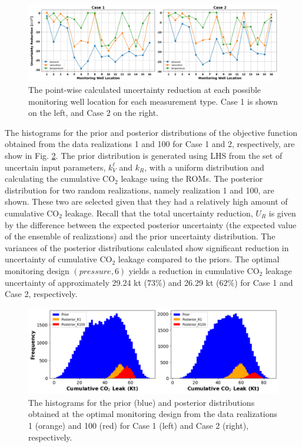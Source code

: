 \documentclass[a4paper,fleqn]{cas-sc}
\begin{document}
\begin{figure}
    \centering
    \includegraphics[width=16cm]{figs/Figure 11.pdf}
    \caption{The point-wise calculated uncertainty reduction at each possible monitoring well location for each measurement type. Case 1 is shown on the left, and Case 2 on the right.}
    \label{point_ur}
\end{figure}

The histograms for the prior and posterior distributions of the objective function obtained from the data realizations 1 and 100 for Case 1 and 2, respectively, are show in Fig. \ref{ur_dist}. The prior distribution is generated using LHS from the set of uncertain input parameters, $k_V^\ell$ and $k_R$, with a uniform distribution and calculating the cumulative CO$_2$ leakage using the ROMs. The posterior distribution for two random realizations, namely realization 1 and 100, are shown. These two are selected given that they had a relatively high amount of cumulative CO$_2$ leakage. Recall that the total uncertainty reduction, $U_R$ is given by the difference between the expected posterior uncertainty (the expected value of the ensemble of realizations) and the prior uncertainty distribution. The variances of the posterior distributions calculated show significant reduction in uncertainty of cumulative CO$_2$ leakage compared to the priors. The optimal monitoring design $(pressure, 6)$ yields a reduction in cumulative CO$_2$ leakage uncertainty of approximately 29.24 kt ($73\%$) and 26.29 kt ($62\%$) for Case 1 and Case 2, respectively. 

\begin{figure}
    \centering
    \includegraphics[width=16cm]{figs/Figure 12.pdf}
    \caption{The histograms for the prior (blue) and posterior distributions obtained at the optimal monitoring design from the data realizations 1 (orange) and 100 (red) for Case 1 (left) and Case 2 (right), respectively.}
    \label{ur_dist}
\end{figure}
\end{document}
